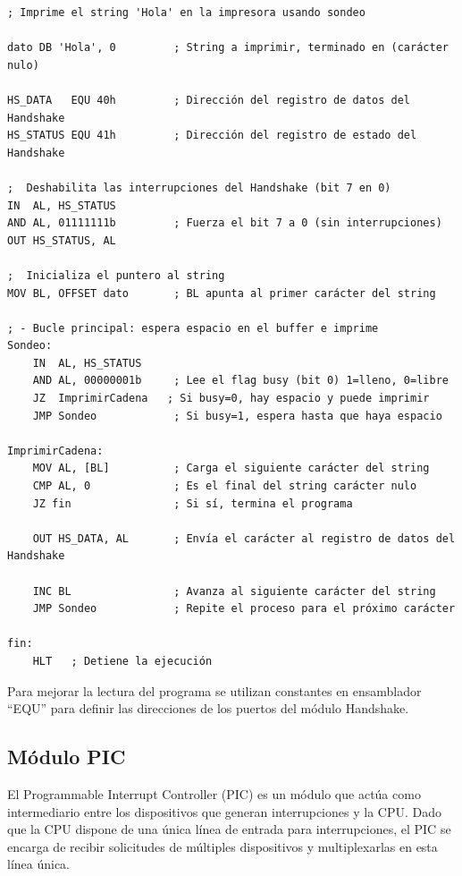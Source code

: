 \documentclass[12pt,oneside]{templates/unerthesis}
\begin{document}
\begin{lstlisting}
; Imprime el string 'Hola' en la impresora usando sondeo

dato DB 'Hola', 0         ; String a imprimir, terminado en (carácter nulo)

HS_DATA   EQU 40h         ; Dirección del registro de datos del Handshake
HS_STATUS EQU 41h         ; Dirección del registro de estado del Handshake

;  Deshabilita las interrupciones del Handshake (bit 7 en 0) 
IN  AL, HS_STATUS
AND AL, 01111111b         ; Fuerza el bit 7 a 0 (sin interrupciones)
OUT HS_STATUS, AL

;  Inicializa el puntero al string 
MOV BL, OFFSET dato       ; BL apunta al primer carácter del string

; - Bucle principal: espera espacio en el buffer e imprime 
Sondeo:
    IN  AL, HS_STATUS
    AND AL, 00000001b     ; Lee el flag busy (bit 0) 1=lleno, 0=libre
    JZ  ImprimirCadena   ; Si busy=0, hay espacio y puede imprimir
    JMP Sondeo            ; Si busy=1, espera hasta que haya espacio

ImprimirCadena:
    MOV AL, [BL]          ; Carga el siguiente carácter del string
    CMP AL, 0             ; Es el final del string carácter nulo
    JZ fin                ; Si sí, termina el programa

    OUT HS_DATA, AL       ; Envía el carácter al registro de datos del Handshake

    INC BL                ; Avanza al siguiente carácter del string
    JMP Sondeo            ; Repite el proceso para el próximo carácter

fin:
    HLT   ; Detiene la ejecución\end{lstlisting}

Para mejorar la lectura del programa se utilizan constantes en ensamblador ``EQU'' para definir las direcciones de los puertos del módulo Handshake.

\hypertarget{muxf3dulo-pic}{%
\subsection{Módulo PIC}\label{muxf3dulo-pic}}

El Programmable Interrupt Controller (PIC) es un módulo que actúa como intermediario entre los dispositivos que generan interrupciones y la CPU. Dado que la CPU dispone de una única línea de entrada para interrupciones, el PIC se encarga de recibir solicitudes de múltiples dispositivos y multiplexarlas en esta línea única.
\end{document}
